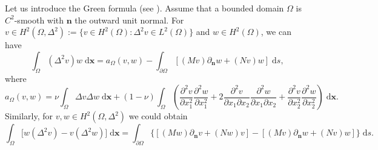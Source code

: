 \documentclass[10pt,a4paper]{article}
\numberwithin{equation}{section}
\begin{document}
Let us introduce the Green formula (see \cite{hsiao_bounday_2021}). Assume that a bounded domain $\Omega$ is $C^2$-smooth with $\bm{ n }$ the outward unit normal.
For $v\in H^2(\Omega,\Delta^2):=\{v \in H^2(\Omega):\Delta^2v \in L^{2}(\Omega)\}$ and $w \in H^2(\Omega)$, we can have
\begin{equation} \label{eq:green-1}
\int_{ \Omega } (\Delta^{2} v) w \;\mathrm{d}\bm{x} = a_{\Omega}(v,w) - \int_{ \partial \Omega } \left[(Mv)\partial_{\bm{n} } w + (Nv) w \right] \;\mathrm{d}s,
\end{equation}
where
\begin{equation*}
  a_{ \Omega}(v,w)= \nu \int_{ \Omega} \Delta v \Delta w \;\mathrm{d} \bm{ x} +
  (1-\nu)\int_{ \Omega} \left( \dfrac{\partial^2 v}{\partial x_1^2}\dfrac{\partial^2 w}{\partial x_1^2}
    + 2 \dfrac{\partial^2 v}{\partial x_1 \partial x_2 }\dfrac{\partial^2 w}{\partial x_1\partial x_2  }
    +\dfrac{\partial^2 v}{\partial x_2^2}\dfrac{\partial^2 w}{\partial x_2^2}
     \right) \;\mathrm{d}\bm{ x}.
\end{equation*}
Similarly, for $v,w \in H^2(\Omega,\Delta^2)$ we could obtain
\begin{equation} \label{eq:green-2}
  \int_{ \Omega }\Big[ w (\Delta^{2} v) -  v(\Delta^{2} w)\Big] \;\mathrm{d}\bm{x} =   \int_{ \partial \Omega }\Big\{
   \left[(Mw)\partial_{\bm{n} } v + (Nw) v \right]
  - \left[(Mv)\partial_{\bm{n} } w + (Nv) w \right]\Big\} \;\mathrm{d}s.
\end{equation}
\end{document}
